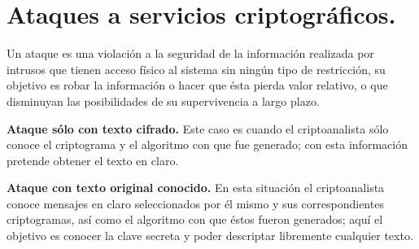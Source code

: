 \section{Ataques a servicios criptográficos. }
Un ataque es una violación a la seguridad de la información realizada por intrusos que tienen acceso físico al sistema sin ningún tipo de restricción, su objetivo es robar la información o hacer que ésta pierda valor relativo, o que disminuyan las posibilidades de su supervivencia a largo plazo.


\textbf{Ataque sólo con texto cifrado. }
Este caso es cuando el criptoanalista sólo conoce el criptograma y el algoritmo con que fue generado; con esta información pretende obtener el texto en claro.

\textbf{Ataque con texto original conocido. }
En esta situación el criptoanalista conoce mensajes en claro seleccionados por él mismo y sus correspondientes criptogramas, así como el algoritmo con que éstos fueron generados; aquí el objetivo es conocer la clave secreta y poder descriptar libremente cualquier texto.

